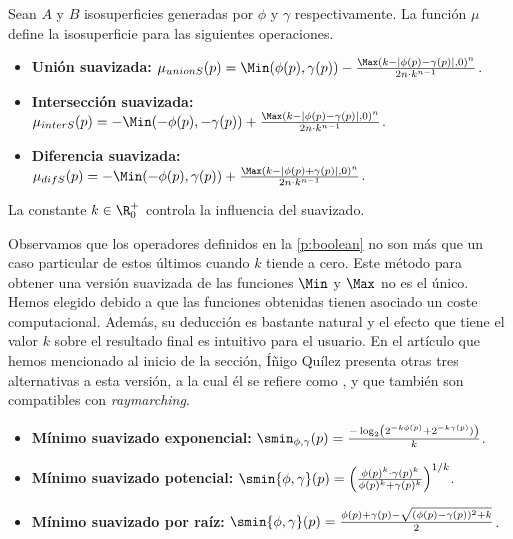 
\begin{definicion}
    Sean $A$ y $B$ isosuperficies generadas por $\phi$ y $\gamma$ respectivamente. La función $\mu$ define la isosuperficie para las siguientes operaciones.
    \begin{itemize}
        \item \textbf{Unión suavizada: } $\mu_{unionS}(p) = \Min(\phi(p),\gamma(p)) - \frac{\Max\left( k - |\phi(p) - \gamma(p)|, 0\right)^n}{2n\cdot k^{n-1}}$.
        \item \textbf{Intersección suavizada: } $\mu_{interS}(p) = -\Min(-\phi(p),-\gamma(p)) + \frac{\Max\left( k - |\phi(p) - \gamma(p)|, 0\right)^n}{2n\cdot k^{n-1}}$.
        \item \textbf{Diferencia suavizada: } $\mu_{difS}(p) = -\Min(-\phi(p),\gamma(p)) + \frac{\Max\left( k - |\phi(p) + \gamma(p)|, 0\right)^n}{2n\cdot k^{n-1}}$.
    \end{itemize}
    La constante $k\in \R^+_0$ controla la influencia del suavizado.        
\end{definicion}

Observamos que los operadores definidos en la \autoref{p:boolean} no son más que un caso particular de estos últimos cuando $k$ tiende a cero. Este método para obtener una versión suavizada de las funciones $\Min$ y $\Max$ no es el único. Hemos elegido debido a que las funciones obtenidas tienen asociado un coste computacional. Además, su deducción es bastante natural y el efecto que tiene el valor $k$ sobre el resultado final es intuitivo para el usuario. En el artículo que hemos mencionado al inicio de la sección, Íñigo Quílez \cite{article:smooth} presenta otras tres alternativas a esta versión, a la cual él se refiere como , y que también son compatibles con \textit{raymarching}.
\begin{itemize}
    \item \textbf{Mínimo suavizado exponencial:} $\smin_{\phi,\gamma}(p) = \frac{-\log_2\left( 2^{-k\phi(p)} + 2^{-k\gamma(p)} ) \right)}{k}$.
    \item \textbf{Mínimo suavizado potencial:} $\smin{\phi,\gamma}(p) = \left(\frac{\phi(p)^k \cdot \gamma(p)^k}{\phi(p)^k + \gamma(p)^k}\right)^{1/k}$.
    \item \textbf{Mínimo suavizado por raíz:} $\smin{\phi,\gamma}(p) = \frac{\phi(p) + \gamma(p) - \sqrt{(\phi(p)-\gamma(p))^2+k}}{2}$.
\end{itemize}

